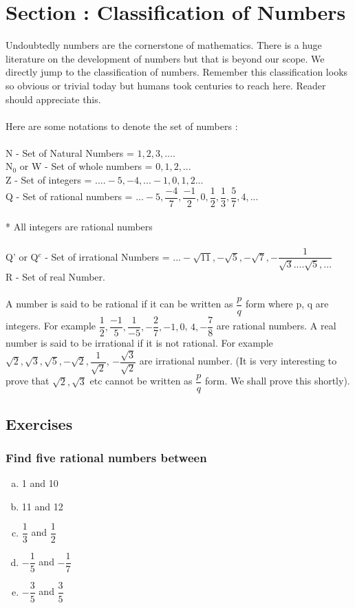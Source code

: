 \documentclass[a4paper,10pt]{article}
\begin{document}
\section{Section : Classification of Numbers}
Undoubtedly numbers are the cornerstone of mathematics. There is a huge
literature on the
development of numbers but that is beyond our scope. We directly jump to
the classification
of numbers. Remember this classification looks so obvious or trivial
today but humans took centuries to reach here. Reader should appreciate
this.\\\\
Here are some notations to denote the set of numbers :\\\\
 N - Set of Natural Numbers = ${1,2,3,....}$\\
 N$_0$ or W - Set of whole numbers = ${0,1,2,...}$\\
Z - Set of integers = ${....-5,-4,...-1,0,1,2...}$\\
Q - Set of rational numbers =
${...-5,\dfrac{-4}{7},\dfrac{-1}{2},0,\dfrac{1}{2},\dfrac{1}{3},\dfrac{5}{7},4,...}$\\\\
* All integers are rational numbers\\\\
Q' or Q$^c$ - Set of irrational Numbers =
$...-\sqrt{11},-\sqrt{5},-\sqrt{7},-\dfrac{1}{\sqrt{3}....\sqrt{5},...}$\\
R - Set of real Number.\\\\
A number is said to be rational if it can be written as $\dfrac{p}{q}$ form where
p, q are integers. For example
$\dfrac{1}{2},\dfrac{-1}{5},\dfrac{1}{-5},-\dfrac{2}{7},-1,0$,
$4,-\dfrac{7}{8}$
are rational numbers. A real number is said to be irrational if it is
not rational. For example
$\sqrt{2},\sqrt{3},\sqrt{5},-\sqrt{2},\dfrac{1}{\sqrt{2}}$,
$-\dfrac{\sqrt{3}}{\sqrt{2}}$
are irrational number. (It is very interesting to prove that
$\sqrt{2},\sqrt{3}$ etc cannot be written as $\dfrac{p}{q}$ form. We
shall prove this shortly). 
\subsection{Exercises}
\subsubsection{Find five rational numbers between}
\begin{multicols}{5}
\begin{enumerate}[a.]
\item 1 and 10
\item 11 and 12
\item $\dfrac{1}{3}$ and $\dfrac{1}{2}$
\item $-\dfrac{1}{5}$ and $-\dfrac{1}{7}$
\item $-\dfrac{3}{5}$ and $\dfrac{3}{5}$  
\end{enumerate}
\end{multicols}
\end{document}
